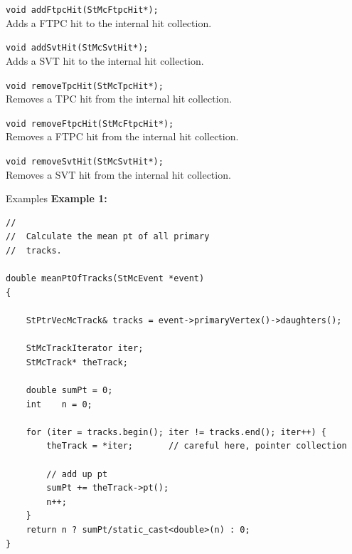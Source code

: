 \begin{Entry}
    \verb+void addFtpcHit(StMcFtpcHit*);+\\
    Adds a FTPC hit to the internal hit collection.

    \verb+void addSvtHit(StMcSvtHit*);+\\
    Adds a SVT hit to the internal hit collection.

    \verb+void removeTpcHit(StMcTpcHit*);+\\
    Removes a TPC hit from the internal hit collection.

    \verb+void removeFtpcHit(StMcFtpcHit*);+\\
    Removes a FTPC hit from the internal hit collection.

    \verb+void removeSvtHit(StMcSvtHit*);+\\
    Removes a SVT hit from the internal hit collection.

\item[Examples]
{\bf Example 1:}
{\footnotesize
\begin{verbatim}
//
//  Calculate the mean pt of all primary
//  tracks.

double meanPtOfTracks(StMcEvent *event)
{
    
    StPtrVecMcTrack& tracks = event->primaryVertex()->daughters();

    StMcTrackIterator iter;
    StMcTrack* theTrack;

    double sumPt = 0;
    int    n = 0;

    for (iter = tracks.begin(); iter != tracks.end(); iter++) {
        theTrack = *iter;       // careful here, pointer collection

        // add up pt
        sumPt += theTrack->pt();
        n++;
    }
    return n ? sumPt/static_cast<double>(n) : 0;
}
\end{verbatim}
}%

\end{Entry}
\clearpage
%
%
